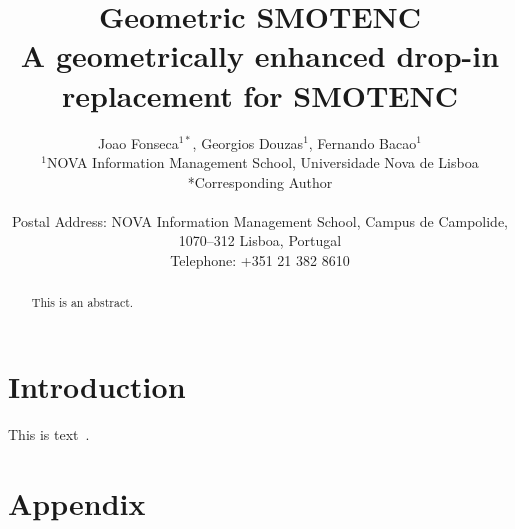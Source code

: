 \documentclass[parskip=full]{scrartcl}
\title{Geometric SMOTENC \\ \LARGE{A geometrically enhanced drop-in
replacement for SMOTENC}}
\author{%
	Joao Fonseca\(^{1*}\), Georgios Douzas\(^{1}\), Fernando Bacao\(^{1}\)
	\\
	\small{\(^{1}\)NOVA Information Management School, Universidade Nova de Lisboa}
	\\
	\small{*Corresponding Author}
	\\
	\\
	\small{Postal Address: NOVA Information Management School, Campus de
    Campolide, 1070--312 Lisboa, Portugal}
	\\
	\small{Telephone: +351 21 382 8610}
}
\date{}
\begin{document}
\maketitle

\begin{abstract}
    This is an abstract.
\end{abstract}

\section{Introduction}

This is text~\cite{Chawla2002}.







\appendix

\section{Appendix}


\end{document}
